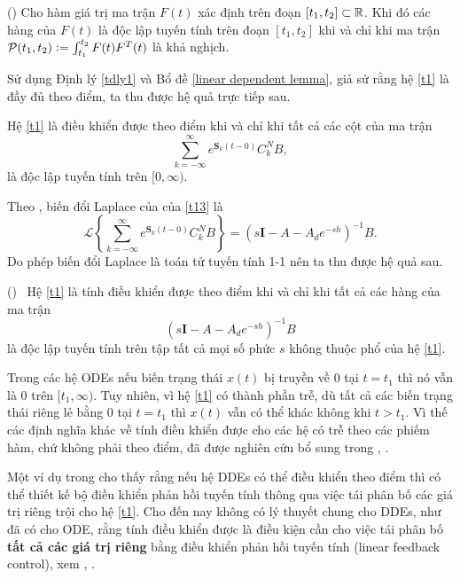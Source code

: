 \begin{bde}\label{linear dependent lemma}(\cite{Che98})
Cho hàm giá trị ma trận $F(t)$ xác định trên đoạn $[t_1,t_2] \subset \mathbb{R}$. Khi đó các hàng của $F(t)$ là độc lập tuyến tính trên đoạn $[t_1,t_2]$ khi và chỉ khi ma trận $\mathcal{P}(t_1,t_2) := \int_{t_1}^{t_2} F(t)F^T(t)$ là khả nghịch.
\end{bde}

\noindent Sử dụng Định lý \ref{tdly1} và Bổ đề \ref{linear dependent lemma}, giả sử rằng hệ \eqref{t1} là đầy đủ theo điểm, ta thu được hệ quả trực tiếp sau.

\begin{hqua}\label{coro 1}
Hệ \eqref{t1} là điều khiển được theo điểm khi và chỉ khi tất cả các cột của ma trận
\begin{equation}\label{t13}
\sum\limits^\infty_{k=-\infty}e^{\mathbf{S}_k(t-0)}C^N_kB,
\end{equation}
là độc lập tuyến tính trên $[0,\infty)$.
\end{hqua}

\noindent Theo \cite{Yi12}, biến đổi Laplace của của \eqref{t13} là 
%
\begin{equation}\label{t14}
\mathcal{L} \left\{ \sum\limits^\infty_{k=-\infty}e^{\mathbf{S}_k(t-0)}C^N_kB \right\} =(s\mathbf{I}-A-A_{d}e^{-sh})^{-1}B.
\end{equation}
%
Do phép biến đổi Laplace là toán tử tuyến tính 1-1 nên ta thu được hệ quả sau.
%
\begin{hqua}\label{coro 2} (\cite{Cho72}) \       
Hệ \eqref{t1} là tính điều khiển được theo điểm khi và chỉ khi tất cả các hàng của ma trận
\begin{equation}\label{t15}
(s\mathbf{I}-A-A_de^{-sh})^{-1}B 
\end{equation} 	  
là độc lập tuyến tính trên tập tất cả mọi số phức $s$ không thuộc phổ của hệ \eqref{t1}.
\end{hqua}	 
%
Trong các hệ ODEs nếu biến trạng thái $x(t)$ bị truyền về $0$ tại $t=t_1$ thì nó vẫn là $0$ trên $[t_1,\infty)$. Tuy nhiên, vì hệ \eqref{t1} có thành phần trễ, dù tất cả các biến trạng thái riêng lẻ bằng $0$ tại $t=t_1$ thì  $x(t)$ vẫn có thể khác không khi $t>t_1$. Vì thế các định nghĩa khác về tính điều khiển được cho các hệ có trễ theo các phiếm hàm, chứ không phải theo điểm, đã được nghiên cứu bổ sung trong \cite{Ric03}, \cite{Wei67}. 

\begin{gch}	          
Một ví dụ trong \cite{YiNU07} cho thấy rằng nếu hệ DDEs có thể điều khiển theo điểm thì có thể thiết kế bộ điều khiển phản hồi tuyến tính thông qua việc tái phân bố các giá trị riêng trội cho hệ \eqref{t1}. Cho đến nay không có lý thuyết chung cho DDEs, như đã có cho ODE, rằng tính điều khiển được là điều kiện cần cho việc tái phân bố \textbf{tất cả các giá trị riêng} bằng điều khiển phản hồi tuyến tính (linear feedback control), xem \cite{Tso78}, \cite{Van72}.
\end{gch}

